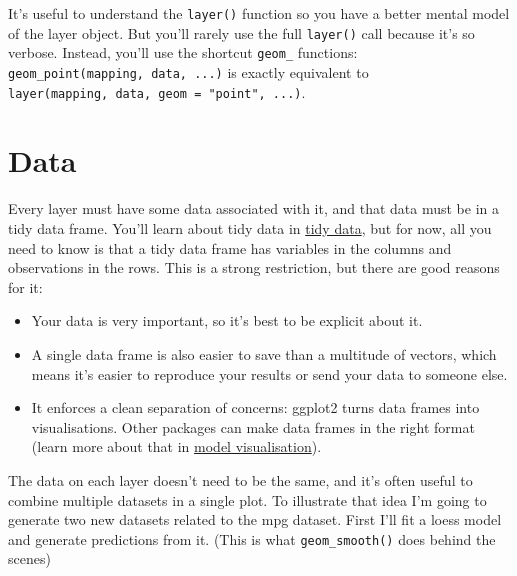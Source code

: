 It's useful to understand the \texttt{layer()} function so you have a
better mental model of the layer object. But you'll rarely use the full
\texttt{layer()} call because it's so verbose. Instead, you'll use the
shortcut \texttt{geom\_} functions:
\texttt{geom\_point(mapping,\ data,\ ...)} is exactly equivalent to
\texttt{layer(mapping,\ data,\ geom\ =\ "point",\ ...)}.

\hypertarget{sec:data}{\section{Data}\label{sec:data}}

Every layer must have some data associated with it, and that data must
be in a tidy data frame. You'll learn about tidy data in
\protect\hyperlink{cha:data}{tidy data}, but for now, all you need to
know is that a tidy data frame has variables in the columns and
observations in the rows. This is a strong restriction, but there are
good reasons for it:  

\begin{itemize}
\item
  Your data is very important, so it's best to be explicit about it.
\item
  A single data frame is also easier to save than a multitude of
  vectors, which means it's easier to reproduce your results or send
  your data to someone else.
\item
  It enforces a clean separation of concerns: ggplot2 turns data frames
  into visualisations. Other packages can make data frames in the right
  format (learn more about that in
  \protect\hyperlink{sub:modelvis}{model visualisation}).
\end{itemize}

The data on each layer doesn't need to be the same, and it's often
useful to combine multiple datasets in a single plot. To illustrate that
idea I'm going to generate two new datasets related to the mpg dataset.
First I'll fit a loess model and generate predictions from it. (This is
what \texttt{geom\_smooth()} does behind the scenes)

